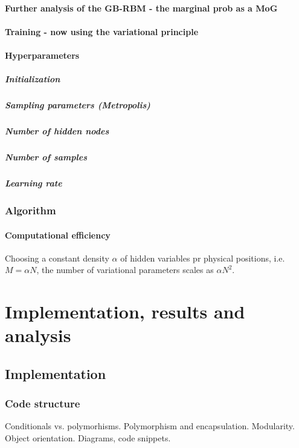 \documentclass[twoside,english]{uiofysmaster}
\begin{document}
\subsection{Further analysis of the GB-RBM - the marginal prob as a MoG}
\subsection{Training - now using the variational principle}
\subsection{Hyperparameters}
\subsubsection{Initialization}
\subsubsection{Sampling parameters (Metropolis)}
\subsubsection{Number of hidden nodes}
\subsubsection{Number of samples}
\subsubsection{Learning rate}
\section{Algorithm}
\subsection{Computational efficiency}
Choosing a constant density $\alpha$ of hidden variables pr physical positions, i.e. $M=\alpha N$, the number of variational parameters scales as $\alpha N^2$.

\part{Implementation, results and analysis}
\chapter{Implementation}
\section{Code structure}
Conditionals vs. polymorhisms. Polymorphism and encapsulation. Modularity. Object orientation. Diagrams, code snippets. 
\end{document}
